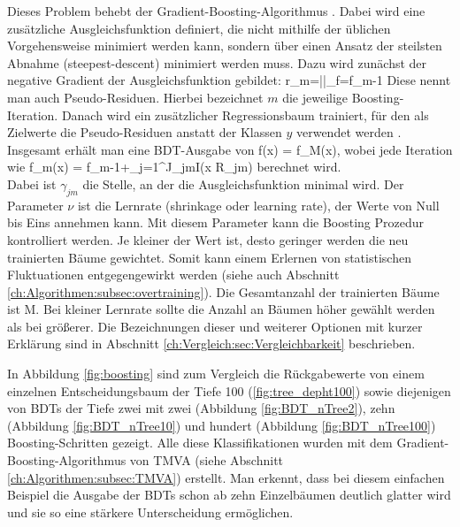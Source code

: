 Dieses Problem behebt der Gradient-Boosting-Algorithmus \cite{Friedman00greedyfunction}. Dabei wird eine zus\"atzliche Ausgleichsfunktion definiert, die nicht mithilfe der \"ublichen Vorgehensweise minimiert werden kann, sondern \"uber einen Ansatz der steilsten Abnahme (steepest-descent) minimiert werden muss. Dazu wird zun\"achst der negative Gradient der Ausgleichsfunktion gebildet:
\beq
r_m=\left|\right|_{f=f_{m-1}}
\label{eq:pseudo_residual}
\eeq
Diese nennt man auch Pseudo-Residuen. Hierbei bezeichnet $m$ die jeweilige Boosting-Iteration. Danach wird ein zus\"atzlicher Regressionsbaum trainiert, f\"ur den als Zielwerte die Pseudo-Residuen anstatt der Klassen $y$ verwendet werden \cite{Hocker:2007ht}.\\
Insgesamt erh\"alt man eine BDT-Ausgabe von
\beq
\hat f(x) = f_M(x),
\eeq
wobei jede Iteration wie
\beq
f_m(x) = f_{m-1}+\nu\cdot\sum_{j=1}^J\gamma_{jm}I(x \in R_{jm})
\eeq
berechnet wird.\\
Dabei ist $\gamma_{jm}$ die Stelle, an der die Ausgleichsfunktion minimal wird.
Der Parameter $\nu$ ist die Lernrate (shrinkage oder learning rate), der Werte von Null bis Eins annehmen kann. Mit diesem Parameter kann die Boosting Prozedur kontrolliert werden. Je kleiner der Wert ist, desto geringer werden die neu trainierten B\"aume gewichtet. Somit kann einem Erlernen von statistischen Fluktuationen entgegengewirkt werden (siehe auch Abschnitt \ref{ch:Algorithmen:subsec:overtraining}). Die Gesamtanzahl der trainierten B\"aume ist M. Bei kleiner Lernrate sollte die Anzahl an B\"aumen h\"oher gew\"ahlt werden als bei gr\"o\ss erer. Die Bezeichnungen dieser und weiterer Optionen mit kurzer Erkl\"arung sind in Abschnitt \ref{ch:Vergleich:sec:Vergleichbarkeit} beschrieben.

In Abbildung \ref{fig:boosting} sind zum Vergleich die R\"uckgabewerte von einem einzelnen Entscheidungsbaum der Tiefe 100 (\ref{fig:tree_depht100}) sowie diejenigen von BDTs der Tiefe zwei mit zwei (Abbildung \ref{fig:BDT_nTree2}), zehn (Abbildung \ref{fig:BDT_nTree10}) und hundert (Abbildung \ref{fig:BDT_nTree100}) Boosting-Schritten gezeigt. Alle diese Klassifikationen wurden mit dem Gradient-Boosting-Algorithmus von TMVA (siehe Abschnitt \ref{ch:Algorithmen:subsec:TMVA}) erstellt. Man erkennt, dass bei diesem einfachen Beispiel die Ausgabe der BDTs schon ab zehn Einzelb\"aumen deutlich glatter wird und sie so eine st\"arkere Unterscheidung erm\"oglichen.

